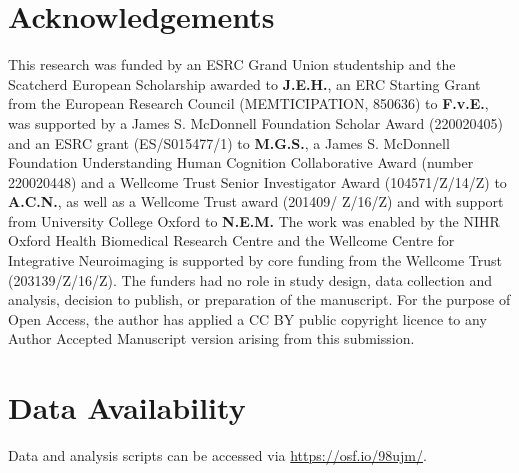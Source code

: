 \documentclass{article}
\begin{document}
\section*{Acknowledgements}
This research was funded by an ESRC Grand Union studentship and the Scatcherd European Scholarship awarded to \textbf{J.E.H.}, an ERC Starting Grant from the European Research Council (MEMTICIPATION, 850636) to \textbf{F.v.E.}, was supported by a James S. McDonnell Foundation Scholar Award (220020405) and an ESRC grant (ES/S015477/1) to \textbf{M.G.S.}, a James S. McDonnell Foundation Understanding Human Cognition Collaborative Award (number 220020448) and a Wellcome Trust Senior Investigator Award (104571/Z/14/Z) to \textbf{A.C.N.}, as well as a Wellcome Trust award (201409/ Z/16/Z) and with support from University College Oxford to \textbf{N.E.M.} The work was enabled by the NIHR Oxford Health Biomedical Research Centre and the Wellcome Centre for Integrative Neuroimaging is supported by core funding from the Wellcome Trust (203139/Z/16/Z). The funders had no role in study design, data collection and analysis, decision to publish, or preparation of the manuscript. For the purpose of Open Access, the author has applied a CC BY public copyright licence to any Author Accepted Manuscript version arising from this submission.

\section*{Data Availability}
Data and analysis scripts can be accessed via \href{https://osf.io/98ujm/}{https://osf.io/98ujm/}. 

\printbibliography
\end{document}
